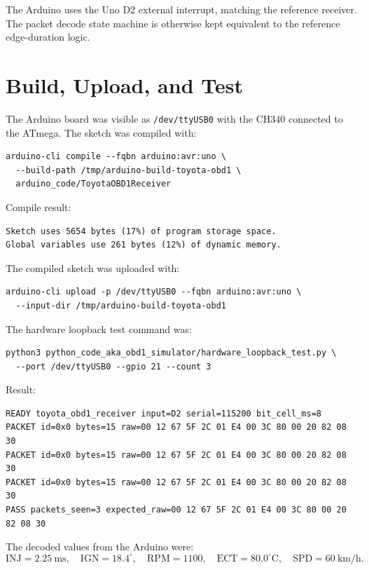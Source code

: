 \documentclass[11pt]{article}
\begin{document}
The Arduino uses the Uno D2 external interrupt, matching the reference
receiver.  The packet decode state machine is otherwise kept equivalent to
the reference edge-duration logic.

\section{Build, Upload, and Test}

The Arduino board was visible as \texttt{/dev/ttyUSB0} with the CH340 connected
to the ATmega.  The sketch was compiled with:

\begin{verbatim}
arduino-cli compile --fqbn arduino:avr:uno \
  --build-path /tmp/arduino-build-toyota-obd1 \
  arduino_code/ToyotaOBD1Receiver
\end{verbatim}

Compile result:

\begin{verbatim}
Sketch uses 5654 bytes (17%) of program storage space.
Global variables use 261 bytes (12%) of dynamic memory.
\end{verbatim}

The compiled sketch was uploaded with:

\begin{verbatim}
arduino-cli upload -p /dev/ttyUSB0 --fqbn arduino:avr:uno \
  --input-dir /tmp/arduino-build-toyota-obd1
\end{verbatim}

The hardware loopback test command was:

\begin{verbatim}
python3 python_code_aka_obd1_simulator/hardware_loopback_test.py \
  --port /dev/ttyUSB0 --gpio 21 --count 3
\end{verbatim}

Result:

\begin{verbatim}
READY toyota_obd1_receiver input=D2 serial=115200 bit_cell_ms=8
PACKET id=0x0 bytes=15 raw=00 12 67 5F 2C 01 E4 00 3C 80 00 20 82 08 30
PACKET id=0x0 bytes=15 raw=00 12 67 5F 2C 01 E4 00 3C 80 00 20 82 08 30
PACKET id=0x0 bytes=15 raw=00 12 67 5F 2C 01 E4 00 3C 80 00 20 82 08 30
PASS packets_seen=3 expected_raw=00 12 67 5F 2C 01 E4 00 3C 80 00 20 82 08 30
\end{verbatim}

The decoded values from the Arduino were:
\[
\mathrm{INJ}=2.25\ \mathrm{ms},\quad
\mathrm{IGN}=18.4^\circ,\quad
\mathrm{RPM}=1100,\quad
\mathrm{ECT}=80.0^\circ\mathrm{C},\quad
\mathrm{SPD}=60\ \mathrm{km/h}.
\]
\end{document}
